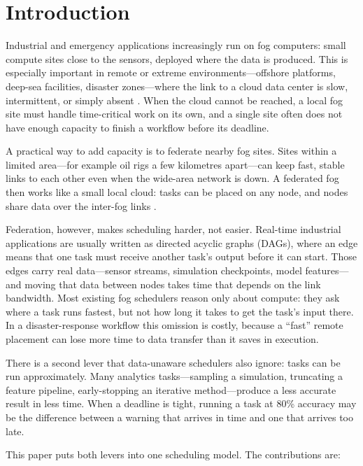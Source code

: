 \documentclass[conference]{IEEEtran}
\begin{document}
\section{Introduction}

Industrial and emergency applications increasingly run on fog computers: small compute sites close to the sensors, deployed where the data is produced. This is especially important in remote or extreme environments---offshore platforms, deep-sea facilities, disaster zones---where the link to a cloud data center is slow, intermittent, or simply absent \cite{rehman2018,cai2019}. When the cloud cannot be reached, a local fog site must handle time-critical work on its own, and a single site often does not have enough capacity to finish a workflow before its deadline.

A practical way to add capacity is to federate nearby fog sites. Sites within a limited area---for example oil rigs a few kilometres apart---can keep fast, stable links to each other even when the wide-area network is down. A federated fog then works like a small local cloud: tasks can be placed on any node, and nodes share data over the inter-fog links \cite{fgcs2024,mattia2023fogcontrol}.

Federation, however, makes scheduling harder, not easier. Real-time industrial applications are usually written as directed acyclic graphs (DAGs), where an edge means that one task must receive another task's output before it can start. Those edges carry real data---sensor streams, simulation checkpoints, model features---and moving that data between nodes takes time that depends on the link bandwidth. Most existing fog schedulers reason only about compute: they ask where a task runs fastest, but not how long it takes to get the task's input there. In a disaster-response workflow this omission is costly, because a ``fast'' remote placement can lose more time to data transfer than it saves in execution.

There is a second lever that data-unaware schedulers also ignore: tasks can be run approximately. Many analytics tasks---sampling a simulation, truncating a feature pipeline, early-stopping an iterative method---produce a less accurate result in less time. When a deadline is tight, running a task at 80\% accuracy may be the difference between a warning that arrives in time and one that arrives too late.

This paper puts both levers into one scheduling model. The contributions are:
\end{document}
